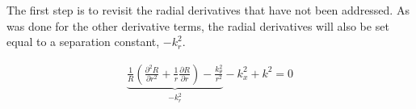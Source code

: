The first step is to revisit the radial derivatives that have not been addressed.
As was done for the other derivative terms, the radial derivatives will also 
be set equal to a separation constant, $-k_r^2$. 

\begin{align}
    \underbrace{\frac{1}{R}
    \left(      
    \frac{\partial^2 R}{\partial r^2 } +
    \frac{1}{r}\frac{\partial R}{\partial r}  
\right) -
    \frac{k_{\theta}^2}{r^2}}_{-k_r^2}-  
    k_x^2 + k^2 = 0
    \label{eqn:wavenumber_without_kr}
\end{align}











